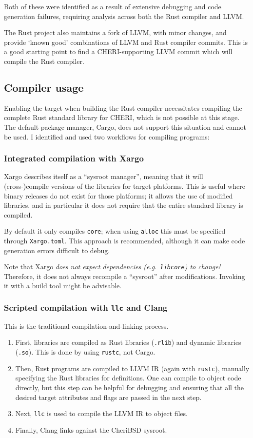 \documentclass[dissertation.tex]{subfiles}
\begin{document}
Both of these were identified as a result of extensive debugging and
code generation failures, requiring analysis across both the Rust compiler
and LLVM.

The Rust project also maintains a fork of LLVM, with minor changes, and
provide `known good' combinations of LLVM and Rust compiler commits.
This is a good starting point to find a CHERI-supporting LLVM commit
which will compile the Rust compiler.


\subsection{Compiler usage}
Enabling the \cuf target when building the Rust compiler necessitates
compiling the complete Rust standard library for CHERI, which is not
possible at this stage.
The default package manager, Cargo, does not support this situation and
cannot be used.
I identified and used two workflows for compiling programs:

\subsubsection{Integrated compilation with Xargo}
Xargo describes itself as a ``sysroot manager'', meaning that it will
(cross-)compile versions of the libraries for target platforms.
This is useful where binary releases do not exist for those platforms;
it allows the use of modified libraries, and in particular it does not
require that the entire standard library is compiled.

By default it only compiles \texttt{core}; when using \texttt{alloc}
this must be specified through \texttt{Xargo.toml}.
This approach is recommended, although it can make code generation
errors difficult to debug.

Note that Xargo \emph{does not expect dependencies (e.g.\
\texttt{libcore}) to change!}
Therefore, it does not always recompile a ``sysroot'' after
modifications.
Invoking it with a build tool might be advisable.

\subsubsection{Scripted compilation with \texttt{llc} and Clang}
This is the traditional compilation-and-linking process.

\begin{enumerate}
    \item First, libraries are compiled as Rust libraries
    (\texttt{.rlib}) and dynamic libraries (\texttt{.so}).
    This is done by using \texttt{rustc}, not Cargo.
    \item Then, Rust programs are compiled to LLVM IR (again with
    \texttt{rustc}), manually specifying the Rust libraries for
    definitions.
    One can compile to object code directly, but this step can be
    helpful for debugging and ensuring that all the desired target
    attributes and flags are passed in the next step.
    \item Next, \texttt{llc} is used to compile the LLVM IR to object
    files.
    \item Finally, Clang links against the CheriBSD sysroot.
\end{enumerate}
\end{document}
